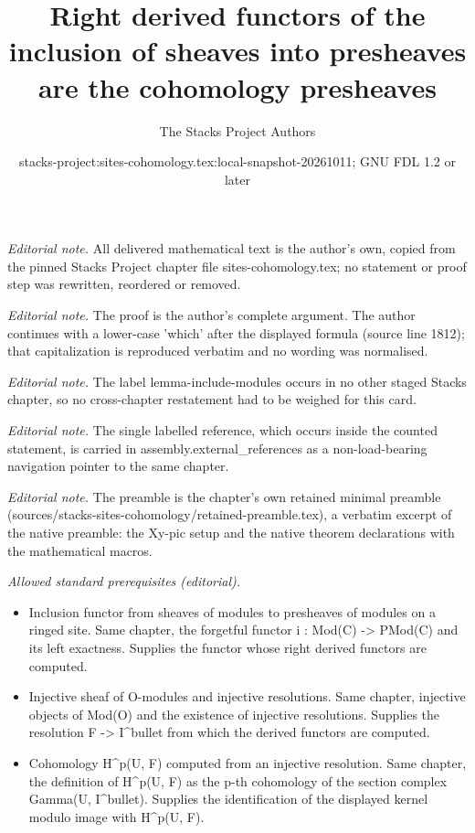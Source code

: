 \documentclass[10pt,a4paper]{amsart}
\title{Right derived functors of the inclusion of sheaves into presheaves are the cohomology presheaves}
\author{The Stacks Project Authors}
\date{stacks-project:sites-cohomology.tex:local-snapshot-20261011; GNU FDL 1.2 or later}
\theoremstyle{plain}
\theoremstyle{definition}
\theoremstyle{remark}
\numberwithin{equation}{subsection}
\begin{document}
\maketitle
\noindent\textit{Editorial note.} All delivered mathematical text is the author's own, copied from the pinned Stacks Project chapter file sites-cohomology.tex; no statement or proof step was rewritten, reordered or removed.\par\medskip
\noindent\textit{Editorial note.} The proof is the author's complete argument. The author continues with a lower-case 'which' after the displayed formula (source line 1812); that capitalization is reproduced verbatim and no wording was normalised.\par\medskip
\noindent\textit{Editorial note.} The label lemma-include-modules occurs in no other staged Stacks chapter, so no cross-chapter restatement had to be weighed for this card.\par\medskip
\noindent\textit{Editorial note.} The single labelled reference, which occurs inside the counted statement, is carried in assembly.external\_references as a non-load-bearing navigation pointer to the same chapter.\par\medskip
\noindent\textit{Editorial note.} The preamble is the chapter's own retained minimal preamble (sources/stacks-sites-cohomology/retained-preamble.tex), a verbatim excerpt of the native preamble: the Xy-pic setup and the native theorem declarations with the mathematical macros.\par\medskip
\noindent\textit{Allowed standard prerequisites (editorial).}\begin{itemize}
\item Inclusion functor from sheaves of modules to presheaves of modules on a ringed site. Same chapter, the forgetful functor i : Mod(C) -> PMod(C) and its left exactness. Supplies the functor whose right derived functors are computed.
\item Injective sheaf of O-modules and injective resolutions. Same chapter, injective objects of Mod(O) and the existence of injective resolutions. Supplies the resolution F -> I\textasciicircum{}bullet from which the derived functors are computed.
\item Cohomology H\textasciicircum{}p(U, F) computed from an injective resolution. Same chapter, the definition of H\textasciicircum{}p(U, F) as the p-th cohomology of the section complex Gamma(U, I\textasciicircum{}bullet). Supplies the identification of the displayed kernel modulo image with H\textasciicircum{}p(U, F).
\end{itemize}\medskip
\end{document}
